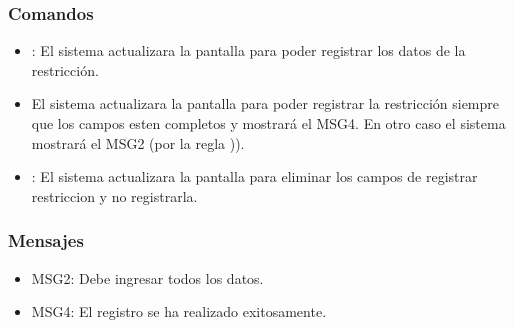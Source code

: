 \subsubsection{Comandos}
\begin{itemize}
 \item {}: El sistema actualizara la pantalla  para poder registrar los datos de la restricción.
 \item {} El sistema actualizara la pantalla  para poder registrar la restricción siempre que los campos esten completos y mostrará el MSG4. En otro caso el sistema mostrará el MSG2 (por la regla )). 
 \item {}: El sistema actualizara la pantalla  para eliminar los campos de registrar restriccion y no registrarla.
\end{itemize}

\subsubsection{Mensajes}
\begin{itemize}
  \item MSG2: Debe ingresar todos los datos.
  \item MSG4: El registro se ha realizado exitosamente.
\end{itemize}